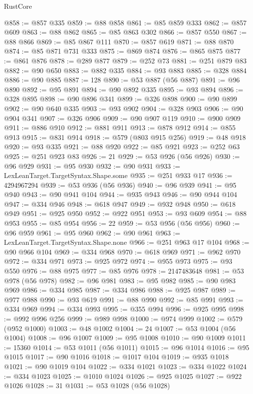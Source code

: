 \begin{lexlean}{RustCore}
\begin{coremodule}
@858 := @857 @335
@859 := @88 @858
@861 := @85 @859 @333
@862 := @857 @609
@863 := @88 @862
@865 := @85 @863 @302
@866 := @857 @550
@867 := @88 @866
@869 := @85 @867 @111
@870 := @857 @619
@871 := @88 @870
@874 := @85 @871 @731 @333
@875 := @869 @874
@876 := @865 @875
@877 := @861 @876
@878 := @289 @877
@879 := @252 @73
@881 := @251 @879 @83
@882 := @90 @650
@883 := @882 @335
@884 := @93 @883
@885 := @328 @884
@886 := @90 @885
@887 := 128
@890 := @53 @887 (@56 @887)
@891 := @96 @890
@892 := @95 @891
@894 := @90 @892 @335
@895 := @93 @894
@896 := @328 @895
@898 := @90 @896 @341
@899 := @326 @898
@900 := @90 @899
@902 := @90 @640 @335
@903 := @93 @902
@904 := @328 @903
@906 := @90 @904 @341
@907 := @326 @906
@909 := @90 @907 @119
@910 := @900 @909
@911 := @886 @910
@912 := @881 @911
@913 := @878 @912
@914 := @855 @913
@915 := @831 @914
@918 := @579 (@803 @915 @256)
@919 := @48 @918
@920 := @93 @335
@921 := @88 @920
@922 := @85 @921
@923 := @252 @63
@925 := @251 @923 @83
@926 := 21
@929 := @53 @926 (@56 @926)
@930 := @96 @929
@931 := @95 @930
@932 := @90 @931
@933 := LexLeanTarget.TargetSyntax.Shape.some
@935 := @251 @933 @17
@936 := 4294967294
@939 := @53 @936 (@56 @936)
@940 := @96 @939
@941 := @95 @940
@943 := @90 @941 @104
@944 := @935 @943
@946 := @90 @944 @104
@947 := @334 @946
@948 := @618 @947
@949 := @932 @948
@950 := @618 @949
@951 := @925 @950
@952 := @922 @951
@953 := @93 @609
@954 := @88 @953
@955 := @85 @954
@956 := 22
@959 := @53 @956 (@56 @956)
@960 := @96 @959
@961 := @95 @960
@962 := @90 @961
@963 := LexLeanTarget.TargetSyntax.Shape.none
@966 := @251 @963 @17 @104
@968 := @90 @966 @104
@969 := @334 @968
@970 := @618 @969
@971 := @962 @970
@972 := @334 @971
@973 := @925 @972
@974 := @955 @973
@975 := @93 @550
@976 := @88 @975
@977 := @85 @976
@978 := 2147483648
@981 := @53 @978 (@56 @978)
@982 := @96 @981
@983 := @95 @982
@985 := @90 @983 @969
@986 := @334 @985
@987 := @334 @986
@988 := @925 @987
@989 := @977 @988
@990 := @93 @619
@991 := @88 @990
@992 := @85 @991
@993 := @334 @969
@994 := @334 @993
@995 := @355 @994
@996 := @925 @995
@998 := @992 @996 @256
@999 := @989 @998
@1000 := @974 @999
@1002 := @579 (@952 @1000)
@1003 := @48 @1002
@1004 := 24
@1007 := @53 @1004 (@56 @1004)
@1008 := @96 @1007
@1009 := @95 @1008
@1010 := @90 @1009
@1011 := 15360
@1014 := @53 @1011 (@56 @1011)
@1015 := @96 @1014
@1016 := @95 @1015
@1017 := @90 @1016
@1018 := @1017 @104
@1019 := @935 @1018
@1021 := @90 @1019 @104
@1022 := @334 @1021
@1023 := @334 @1022
@1024 := @334 @1023
@1025 := @1010 @1024
@1026 := @925 @1025
@1027 := @922 @1026
@1028 := 31
@1031 := @53 @1028 (@56 @1028)

\end{coremodule}
\end{lexlean}
